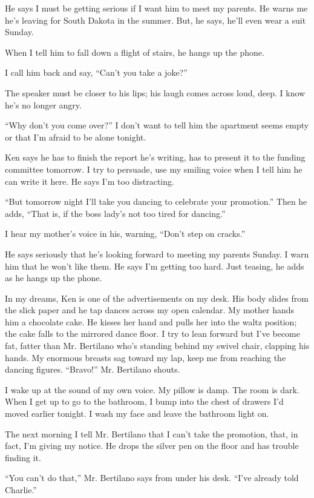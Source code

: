 \documentclass[twoside,10pt]{book}
\begin{document}
He says I must be getting serious if I want him to meet my parents. He
warns me he's leaving for South Dakota in the summer. But, he says,
he'll even wear a suit Sunday.

When I tell him to fall down a flight of stairs, he hangs up the phone.

I call him back and say, ``Can't you take a joke?''

The speaker must be closer to his lips; his laugh comes across loud,
deep. I know he's no longer angry.

``Why don't you come over?'' I don't want to tell him the apartment
seems empty or that I'm afraid to be alone tonight.

Ken says he has to finish the report he's writing, has to present it to
the funding committee tomorrow. I try to persuade, use my smiling voice
when I tell him he can write it here. He says I'm too distracting.

``But tomorrow night I'll take you dancing to celebrate your
promotion.'' Then he adds, ``That is, if the boss lady's not too tired
for dancing.''

I hear my mother's voice in his, warning, ``Don't step on cracks.''

He says seriously that he's looking forward to meeting my parents
Sunday. I warn him that he won't like them. He says I'm getting too
hard. Just teasing, he adds as he hangs up the phone.

In my dreams, Ken is one of the advertisements on my desk. His body
slides from the slick paper and he tap dances across my open calendar.
My mother hands him a chocolate cake. He kisses her hand and pulls her
into the waltz position; the cake falls to the mirrored dance floor. I
try to lean forward but I've become fat, fatter than Mr. Bertilano who's
standing behind my swivel chair, clapping his hands. My enormous breasts
sag toward my lap, keep me from reaching the dancing figures. ``Bravo!''
Mr. Bertilano shouts.

I wake up at the sound of my own voice. My pillow is damp. The room is
dark. When I get up to go to the bathroom, I bump into the chest of
drawers I'd moved earlier tonight. I wash my face and leave the bathroom
light on.

The next morning I tell Mr. Bertilano that I can't take the promotion,
that, in fact, I'm giving my notice. He drops the silver pen on the
floor and has trouble finding it.

``You can't do that,'' Mr. Bertilano says from under his desk. ``I've
already told Charlie.''
\end{document}
